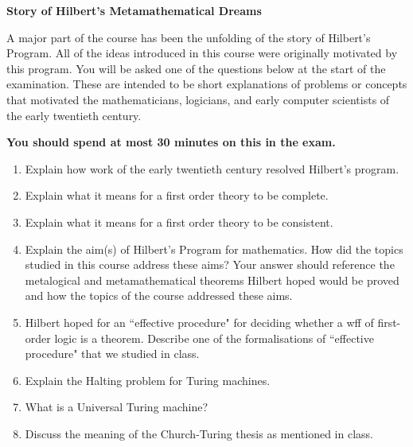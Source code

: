 \documentclass[11pt]{report}
\begin{document}
\newpage
{\bf Story of Hilbert's Metamathematical Dreams}

A major part of the course has been the unfolding of the story of Hilbert's Program. All of the ideas introduced in this course were originally motivated by this program. You will be asked one of the questions below at the start of the examination. These are intended to be short explanations of problems or concepts that motivated the mathematicians, logicians, and early computer scientists of the early twentieth century. 

\vspace{0.3cm}

{\bf You should spend at most 30 minutes on this in the exam.}

\begin{enumerate}
	\item Explain how work of the early twentieth century resolved Hilbert's program.
	
	\item Explain what it means for a first order theory to be complete.
	
	\item Explain what it means for a first order theory to be consistent.
	
	\item Explain the aim(s) of Hilbert's Program for mathematics. How did the topics studied in this course address these aims? Your answer should reference the metalogical and metamathematical theorems Hilbert hoped would be proved and how the topics of the course addressed these aims.
	
	\item Hilbert hoped for an ``effective procedure" for deciding whether a wff of first-order logic is a theorem. Describe one of the formalisations of ``effective procedure" that we studied in class.
	
	\item Explain the Halting problem for Turing machines.  
	
	\item What is a Universal Turing machine? 
	
	\item Discuss the meaning of the Church-Turing thesis as mentioned in class. 
\end{enumerate}
\end{document}
